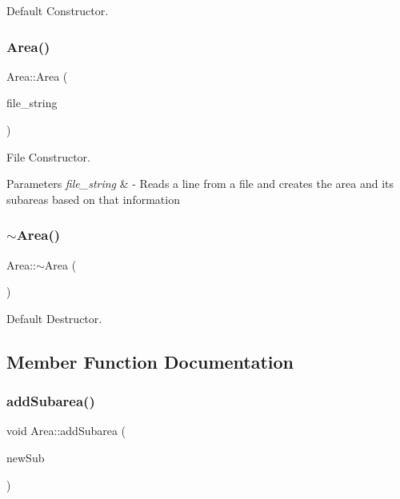 Default Constructor. 

\mbox{\label{classArea_afd32499f2246ef8007fd135d7503da16}} 
\subsubsection{\texorpdfstring{Area()}{Area()}\hspace{0.1cm}{\footnotesize\ttfamily [2/2]}}
{\footnotesize\ttfamily Area\+::\+Area (\begin{DoxyParamCaption}\item[{std\+::string}]{file\+\_\+string }\end{DoxyParamCaption})}



File Constructor. 


\begin{DoxyParams}{Parameters}
{\em file\+\_\+string} & -\/ Reads a line from a file and creates the area and its subareas based on that information \\
\hline
\end{DoxyParams}
\mbox{\label{classArea_ace0975982b61a16746c564a0d43a4cc8}} 
\subsubsection{\texorpdfstring{$\sim$\+Area()}{~Area()}}
{\footnotesize\ttfamily Area\+::$\sim$\+Area (\begin{DoxyParamCaption}{ }\end{DoxyParamCaption})\hspace{0.3cm}{\ttfamily [virtual]}}



Default Destructor. 



\subsection{Member Function Documentation}
\mbox{\label{classArea_a137ad0664d3993ff994e2381804459e2}} 
\subsubsection{\texorpdfstring{add\+Subarea()}{addSubarea()}}
{\footnotesize\ttfamily void Area\+::add\+Subarea (\begin{DoxyParamCaption}\item[{\mbox{\hyperlink{classSubArea}{Sub\+Area}} $\ast$}]{new\+Sub }\end{DoxyParamCaption})}



